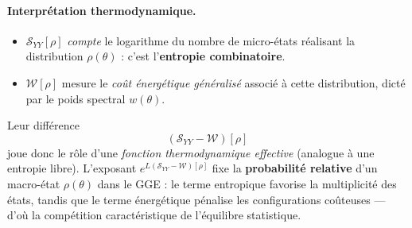 

\paragraph{Interprétation thermodynamique.}

\begin{itemize}[label = $\bullet$] 
\item $\mathcal{S}_{YY}[\rho]$ \emph{compte} le logarithme du nombre de
      micro-états réalisant la distribution $\rho(\theta)$ :
      c’est l’\textbf{entropie combinatoire}.
\item $\mathcal{W}[\rho]$ mesure le \emph{coût énergétique généralisé}
      associé à cette distribution, dicté par le poids spectral $w(\theta)$.
\end{itemize}

Leur différence
\[
(\mathcal{S}_{YY}-\mathcal{W})[\rho]
\]
joue donc le rôle d’une \emph{fonction thermodynamique effective}
(analogue à une entropie libre).  
L’exposant $e^{L(\mathcal{S}_{YY}-\mathcal{W})[\rho]}$ fixe la \textbf{probabilité relative} d’un
macro-état $\rho(\theta)$ dans le GGE : le terme entropique favorise la
multiplicité des états, tandis que le terme énergétique pénalise les
configurations coûteuses — d’où la compétition caractéristique de
l’équilibre statistique.






